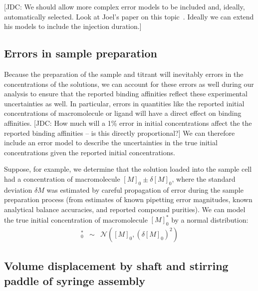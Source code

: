 \documentclass[aps,pre,twocolumn,nofootinbib,superscriptaddress,linenumbers]{revtex4-1}
\begin{document}
{\color{red}[JDC: We should allow more complex error models to be included and, ideally, automatically selected.  Look at Joel's paper on this topic~\cite{tellinghuisen:anal-biochem:2005:itc-generalized-least-squares}. Ideally we can extend his models to include the injection duration.]}

\subsection{Errors in sample preparation}

Because the preparation of the sample and titrant will inevitably errors in the concentrations of the solutions, we can account for these errors as well during our analysis to ensure that the reported binding affinities reflect these experimental uncertainties as well.
In particular, errors in quantities like the reported initial concentrations of macromolecule or ligand will have a direct effect on binding affinities.
{\color{red} [JDC: How much will a 1\% error in initial concentrations affect the the reported binding affinities -- is this directly proportional?]}
We can therefore include an error model to describe the uncertainties in the true initial concentrations given the reported initial concentrations.

Suppose, for example, we determine that the solution loaded into the sample cell had a concentration of macromolecule $[M]_0 \pm \delta [M]_0$, where the standard deviation $\delta M$ was estimated by careful propagation of error during the sample preparation process (from estimates of known pipetting error magnitudes, known analytical balance accuracies, and reported compound purities).
We can model the true initial concentration of macromolecule $[M]_0^*$ by a normal distribution:
\begin{eqnarray}
[M]^*_0 &\sim& \mathcal{N}([M]_0, (\delta [M]_0)^2)
\end{eqnarray}

\subsection{Volume displacement by shaft and stirring paddle of syringe assembly}
\end{document}
